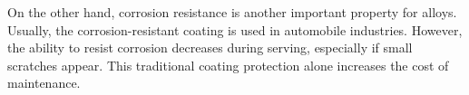 On the other hand, corrosion resistance is another important property for alloys. Usually, the corrosion-resistant coating is used in automobile industries. However, the ability to resist corrosion decreases during serving, especially if small scratches appear. This traditional coating protection alone increases the cost of maintenance.